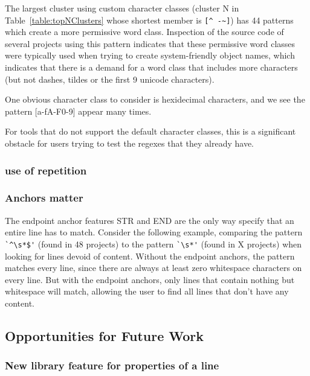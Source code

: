 The largest cluster using custom character classes (cluster N in Table~\ref{table:topNClusters} whose shortest member is \verb•[^ -~]•) has 44 patterns which create a more permissive word class.  Inspection of the source code of several projects using this pattern indicates that these permissive word classes were typically used when trying to create system-friendly object names, which indicates that there is a demand for a word class that includes more characters (but not dashes, tildes or the first 9 unicode characters).




One obvious character class to consider is hexidecimal characters, and we see the pattern [a-fA-F0-9] appear many times.

For tools that do not support the default character classes, this is a significant obstacle for users trying to test the regexes that they already have.

\subsubsection{use of repetition}


\subsubsection{Anchors matter}
The endpoint anchor features STR and END are the only way specify that an entire line has to match.  Consider the following example, comparing the pattern \verb!`^\s*$'! (found in 48 projects) to the pattern \verb!`\s*'! (found in X projects) when looking for lines devoid of content.  Without the endpoint anchors, the pattern matches every line, since there are always at least zero whitespace characters on every line.  But with the endpoint anchors, only lines that contain nothing but whitespace will match, allowing the user to find all lines that don't have any content.



\subsection{Opportunities for Future Work}



\subsubsection{New library feature for properties of a line}

